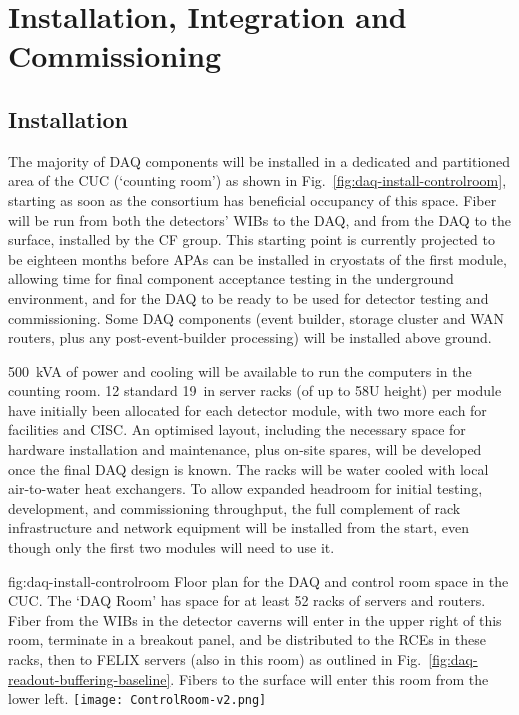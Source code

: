 
\section{Installation, Integration and Commissioning}
\label{sec:fdsp-daq-install}

\subsection{Installation}
\label{sec:fdsp-daq-install-transport}

The majority of DAQ components will be installed in a dedicated and partitioned area of the CUC (`counting room') as shown in Fig.~\ref{fig:daq-install-controlroom}, starting as soon as the consortium has beneficial occupancy of this space. Fiber will be run from both the detectors' WIBs to the DAQ, and from the DAQ to the surface, installed by the CF group. This starting point is currently projected to be eighteen months before APAs can be installed in cryostats of the first module, allowing time for final component acceptance testing in the underground environment, and for the DAQ to be ready to be used for detector testing and commissioning. Some DAQ components (event builder, storage cluster and WAN routers, plus any post-event-builder processing) will be installed above ground.

\SI{500}{kVA} of power and cooling will be available to run the computers in the counting room. 12 standard \SI{19}{in} server racks (of up to 58U height) per module have initially been allocated for each detector module, with two more each for facilities and CISC. An optimised layout, including the necessary space for hardware installation and maintenance, plus on-site spares, will be developed once the final DAQ design is known. The racks will be water cooled with local air-to-water heat exchangers. To allow expanded headroom for initial testing, development, and commissioning throughput, the full complement of rack infrastructure and network equipment will be installed from the start, even though only the first two modules will need to use it.

\begin{dunefigure}{fig:daq-install-controlroom}
  {Floor plan for the DAQ and control room space in the CUC.  The `DAQ
    Room' has space for at least 52 racks of servers and routers.
    Fiber from the WIBs in the detector caverns will enter in the upper
    right of this room, terminate in a breakout panel, and be
    distributed to the RCEs in these racks, then to FELIX servers (also
    in this room) as outlined in
    Fig.~\ref{fig:daq-readout-buffering-baseline}.  Fibers to the
    surface will enter this room from the lower left.}
\texttt{[image: ControlRoom-v2.png]}
\end{dunefigure}

